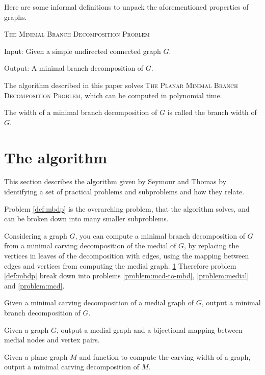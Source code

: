 \documentclass{article}
\begin{document}
	Here are some informal definitions to unpack the aforementioned properties of graphs.

	\begin{definition}\label{def:mbdp}
		\textsc{The Minimal Branch Decomposition Problem}

		Input: Given a simple undirected connected graph $G$.

		Output: A minimal branch decomposition of $G$.
	\end{definition}

	The algorithm described in this paper solves \textsc{The Planar Minimal Branch Decomposition Problem}, which can be computed in polynomial time.

	The width of a minimal branch decomposition of $G$ is called the branch width of $G$.

\section{The algorithm}
	This section describes the algorithm given by Seymour and Thomas\cite{ST93} by identifying a set of practical problems and subproblems and how they relate.
	
	Problem \ref{def:mbdp} is the overarching problem, that the algorithm solves, and can be broken down into many smaller subproblems.

	Considering a graph $G$, you can compute a minimal branch decomposition of $G$ from a minimal carving decomposition of the medial of $G$, by replacing the vertices in leaves of the decomposition with edges, using the mapping between edges and vertices from computing the medial graph. \ref{} Therefore problem \ref{def:mbdp} break down into problems \ref{problem:mcd-to-mbd}, \ref{problem:medial} and \ref{problem:mcd}.

	\begin{problem}\label{problem:mcd-to-mbd}
		Given a minimal carving decomposition of a medial graph of $G$, output a minimal branch decomposition of $G$.
	\end{problem}

	\begin{problem}\label{problem:medial}
		Given a graph $G$, output a medial graph and a bijectional mapping between medial nodes and vertex pairs.
	\end{problem}

	\begin{problem}\label{problem:mcd}
		Given a plane graph $M$ and function to compute the carving width of a graph, output a minimal carving decomposition of $M$.
	\end{problem}
\end{document}
